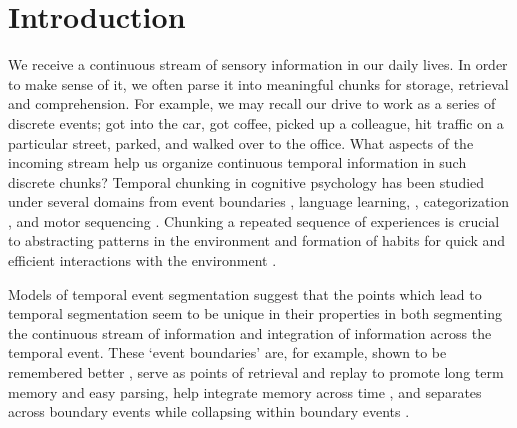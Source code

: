 \section{Introduction}
We receive a continuous stream of sensory information in our daily lives. In order to make sense of it, we often parse it into meaningful chunks for storage, retrieval and comprehension. For example, we may recall our drive to work as a series of discrete events; got into the car, got coffee, picked up a colleague, hit traffic on a particular street, parked, and walked over to the office. What aspects of the incoming stream help us organize continuous temporal information in such discrete chunks? 
Temporal chunking in cognitive psychology has been studied under several domains from event boundaries \parencite{clewett2019transcending, zacks2007event, rouhani2020reward,rouhani2018dissociable,dubrow2013influence,baldwin2008segmenting}, language learning, \parencite{romberg2010statistical,knowlton1992intact}, categorization \parencite{unger2022ready,gabay2015incidental}, and motor sequencing \parencite{bera2021motor, tremblay2010movement, savalia2016unified,ostlund2009evidence}. Chunking a repeated sequence of experiences is crucial to abstracting patterns in the environment and formation of habits for quick and efficient interactions with the environment \parencite{dezfouli2012habits, smith2016habit,dolan2013goals, dezfouli2014habits, gershman2010learning, botvinick2012hierarchical}. 

Models of temporal event segmentation suggest that the points which lead to temporal segmentation seem to be unique in their properties in both segmenting the continuous stream of information and integration of information across the temporal event. These `event boundaries' are, for example, shown to be remembered better \parencite{swallow2009event,rouhani2018dissociable,rouhani2018dissociable, zacks2020event, radvansky2017event, heusser2018perceptual}, serve as points of retrieval \parencite{michelmann2023evidence} and replay to promote long term memory \parencite{hahamy2023human, sols2017event} and easy parsing, help integrate memory across time \parencite{clewett2019transcending}, and separates across boundary events while collapsing within boundary events \parencite{clewett2019transcending, lositsky2016neural,ezzyat2014similarity, brunec2018boundaries}. 

